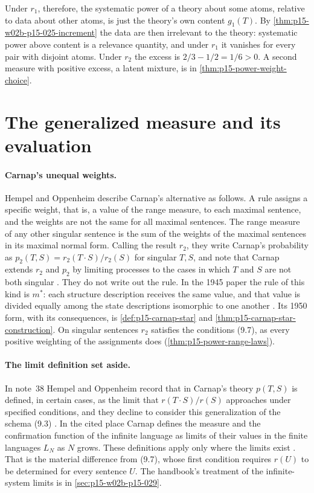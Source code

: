 Under \(r_1\), therefore, the systematic power of a theory about some
atoms, relative to data about other atoms, is just the theory's own
content \(g_1(T)\). By \cref{thm:p15-w02b-p15-025-increment} the data are
then irrelevant to the theory: systematic power above content is a
relevance quantity, and under \(r_1\) it vanishes for every pair with
disjoint atoms. Under \(r_2\) the excess is \(2/3-1/2=1/6>0\). A second
measure with positive excess, a latent mixture, is in
\cref{thm:p15-power-weight-choice}.

\section{The generalized measure and its evaluation}
\label{sec:p15-w02c-p15-029-evaluation}

\paragraph{Carnap's unequal weights.}
Hempel and Oppenheim describe Carnap's alternative as follows. A rule
assigns a specific weight, that is, a value of the range measure, to each
maximal sentence, and the weights are not the same for all maximal
sentences. The range measure of any other singular sentence is the sum of
the weights of the maximal sentences in its maximal normal form. Calling
the result \(r_2\), they write Carnap's probability as
\(p_2(T,S)=r_2(T\cdot S)/r_2(S)\) for singular \(T,S\), and note that
Carnap extends \(r_2\) and \(p_2\) by limiting processes to the cases in
which \(T\) and \(S\) are not both singular
\cite[p.~170]{HempelOppenheim1948Explanation}. They do not write out the
rule. In the 1945 paper the rule of this kind is \(m^\ast\): each
structure description receives the same value, and that value is divided
equally among the state descriptions isomorphic to one another
\cite[p.~80, (3)--(5)]{Carnap1945InductiveLogic}. Its 1950 form, with
its consequences, is \cref{def:p15-carnap-star} and
\cref{thm:p15-carnap-star-construction}. On singular sentences
\(r_2\) satisfies the conditions (9.7), as every positive weighting of
the assignments does (\cref{thm:p15-power-range-laws}).

\paragraph{The limit definition set aside.}
In note~38 Hempel and Oppenheim record that in Carnap's theory
\(p(T,S)\) is defined, in certain cases, as the limit that
\(r(T\cdot S)/r(S)\) approaches under specified conditions, and they
decline to consider this generalization of the schema (9.3)
\cite[p.~170, n.~38]{HempelOppenheim1948Explanation}. In the cited
place Carnap defines the measure and the confirmation function of the
infinite language as limits of their values in the finite languages
\(L_N\) as \(N\) grows. These definitions apply only where the limits
exist \cite[p.~75, (6)--(7)]{Carnap1945InductiveLogic}. That is the
material difference from (9.7), whose first condition requires \(r(U)\)
to be determined for every sentence \(U\). The handbook's treatment of
the infinite-system limits is in \cref{sec:p15-w02b-p15-029}.

